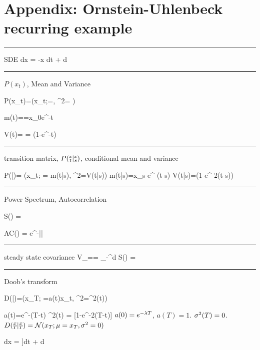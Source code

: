 \section{Appendix: Ornstein-Uhlenbeck 
recurring example}

\hrule
SDE
\beq  
dx = -\lam x dt + d\rvB
\eeq
\hrule
\noindent$P(x_t)$, Mean and Variance

\beq
P(x_t)=\caln(x_t;\mu=, 
\s^2= )
\eeq

\beq
m(t)==x_0e^{-\lam t}
\eeq

\beq
V(t)=
 = (1-e^{-\lam t})
\eeq



\hrule
\noindent transition  matrix, $P(\substack{x\\t}|\substack{x\\s})$, conditional mean and variance

\beq
P(|)= \caln(x_t; \mu= m(t|s), \s^2=V(t|s))
\eeq
\beq
m(t|s)=x_s e^{-\lam (t-s)}
\eeq
\beq
V(t|s)=(1-e^{-2\lam (t-s)})
\eeq
\hrule\noindent Power Spectrum, Autocorrelation

\beq
S(\omega) =
\eeq

\beq AC(\tau) =
e^{-\lam|\tau|}
\eeq

\hrule\noindent steady state covariance
\beq
V_\infty==
\int_{-\infty}^{\infty}d\omega\; S(\omega) = 
\eeq

\hrule \noindent Doob's transform

\beq
D(|)=\caln(x_T; \mu=a(t)x_t, \s^2=\sigma^2(t))
\eeq

\beq
a(t)=e^{-\lam(T-t)}
\eeq
\beq
\s^2(t) = [1-e^{-2\lam(T-t)}]
\eeq
$a(0)=e^{-\lambda T}$, $a(T)=1$. $\sigma^2(T)=0$. 
$D(\substack{x\\T}|\substack{x\\T})=
{\cal N}(x_T; \mu=x_T, \sigma^2=0)$


\beq
dx = \left[
-\lam x+ \frac{qa}{\s^2}[x_T-ax]
\right]dt + d\rvB
\eeq

